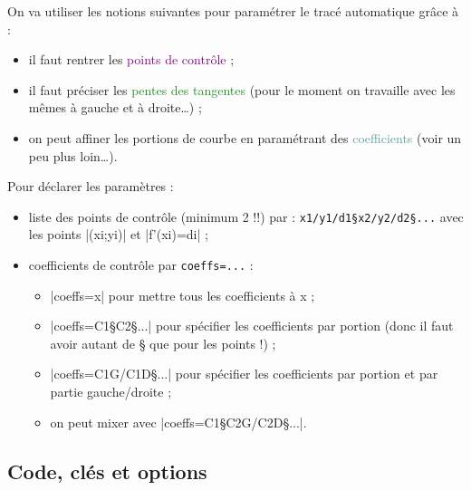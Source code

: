 \documentclass[a4paper,french,11pt]{article}
\newcommand\ctex[1]{\tcbox[vignettelatex]{#1}}
\begin{document}
\begin{codeinfo}
On va utiliser les notions suivantes pour paramétrer le tracé \og automatique \fg{} grâce à  \ctex{..controls} :
%
\begin{itemize}
	\item il faut rentrer les \textcolor{purple}{\textsf{points de contrôle}} ;
	\item il faut préciser les \textcolor{ForestGreen}{\textsf{pentes des tangentes}} (pour le moment on travaille avec les mêmes à gauche et à droite\ldots) ;
	\item on peut \og affiner \fg{} les portions de courbe en paramétrant des \textcolor{CadetBlue}{\textsf{coefficients}} (voir un peu plus loin\ldots).
\end{itemize}

\medskip

Pour déclarer les paramètres :
%
\begin{itemize}
	\item liste des points de contrôle (minimum 2 !!) par : \verb|x1/y1/d1§x2/y2/d2§...| avec les points \pverb|(xi;yi)| et \vverb|f'(xi)=di| ;
	\item coefficients de contrôle par \verb|coeffs=...| :
	\begin{itemize}
		\item \averb|coeffs=x| pour mettre tous les coefficients à x ;
		\item \averb|coeffs=C1§C2§...| pour spécifier les coefficients par portion (donc il faut avoir autant de § que pour les points !) ;
		\item \averb|coeffs=C1G/C1D§...| pour spécifier les coefficients par portion et par partie gauche/droite ;
		\item on peut mixer avec \averb|coeffs=C1§C2G/C2D§...|.
	\end{itemize}
\end{itemize}
\end{codeinfo}

\subsection{Code, clés et options}

\begin{codetex}
\end{codetex}
\end{document}
